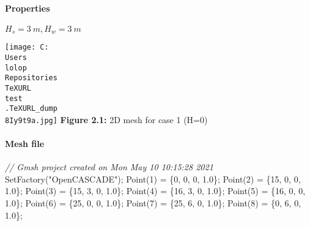 \documentclass[11pt]{article}
\newenvironment{Shaded}{}{}
\newcommand{\DecValTok}[1]{\textcolor[rgb]{0.25,0.63,0.44}{{#1}}}
\newcommand{\FloatTok}[1]{\textcolor[rgb]{0.25,0.63,0.44}{{#1}}}
\newcommand{\StringTok}[1]{\textcolor[rgb]{0.25,0.44,0.63}{{#1}}}
\newcommand{\CommentTok}[1]{\textcolor[rgb]{0.38,0.63,0.69}{\textit{{#1}}}}
\newcommand{\NormalTok}[1]{{#1}}
\newcommand{\OperatorTok}[1]{\textcolor[rgb]{0.40,0.40,0.40}{{#1}}}
\begin{document}
\hypertarget{properties-1}{%
\paragraph{Properties}\label{properties-1}}

\(H_s = 3\ m, H_w = 3\ m\)

\texttt{[image: C:\\Users\\lolop\\Repositories\\TeXURL\\test\\.TeXURL\_dump\\8Iy9t9a.jpg]} \textbf{Figure 2.1:}
2D mesh for case 1 (H=0)

\hypertarget{mesh-file}{%
\paragraph{Mesh file}\label{mesh-file}}

\begin{Shaded}
\begin{Highlighting}[]
\CommentTok{// Gmsh project created on Mon May 10 10:15:28 2021}
\NormalTok{SetFactory}\OperatorTok{(}\StringTok{"OpenCASCADE"}\OperatorTok{);}
\NormalTok{Point}\OperatorTok{(}\DecValTok{1}\OperatorTok{)} \OperatorTok{=} \OperatorTok{\{}\DecValTok{0}\OperatorTok{,} \DecValTok{0}\OperatorTok{,} \DecValTok{0}\OperatorTok{,} \FloatTok{1.0}\OperatorTok{\};}
\NormalTok{Point}\OperatorTok{(}\DecValTok{2}\OperatorTok{)} \OperatorTok{=} \OperatorTok{\{}\DecValTok{15}\OperatorTok{,} \DecValTok{0}\OperatorTok{,} \DecValTok{0}\OperatorTok{,} \FloatTok{1.0}\OperatorTok{\};}
\NormalTok{Point}\OperatorTok{(}\DecValTok{3}\OperatorTok{)} \OperatorTok{=} \OperatorTok{\{}\DecValTok{15}\OperatorTok{,} \DecValTok{3}\OperatorTok{,} \DecValTok{0}\OperatorTok{,} \FloatTok{1.0}\OperatorTok{\};}
\NormalTok{Point}\OperatorTok{(}\DecValTok{4}\OperatorTok{)} \OperatorTok{=} \OperatorTok{\{}\DecValTok{16}\OperatorTok{,} \DecValTok{3}\OperatorTok{,} \DecValTok{0}\OperatorTok{,} \FloatTok{1.0}\OperatorTok{\};}
\NormalTok{Point}\OperatorTok{(}\DecValTok{5}\OperatorTok{)} \OperatorTok{=} \OperatorTok{\{}\DecValTok{16}\OperatorTok{,} \DecValTok{0}\OperatorTok{,} \DecValTok{0}\OperatorTok{,} \FloatTok{1.0}\OperatorTok{\};}
\NormalTok{Point}\OperatorTok{(}\DecValTok{6}\OperatorTok{)} \OperatorTok{=} \OperatorTok{\{}\DecValTok{25}\OperatorTok{,} \DecValTok{0}\OperatorTok{,} \DecValTok{0}\OperatorTok{,} \FloatTok{1.0}\OperatorTok{\};}
\NormalTok{Point}\OperatorTok{(}\DecValTok{7}\OperatorTok{)} \OperatorTok{=} \OperatorTok{\{}\DecValTok{25}\OperatorTok{,} \DecValTok{6}\OperatorTok{,} \DecValTok{0}\OperatorTok{,} \FloatTok{1.0}\OperatorTok{\};}
\NormalTok{Point}\OperatorTok{(}\DecValTok{8}\OperatorTok{)} \OperatorTok{=} \OperatorTok{\{}\DecValTok{0}\OperatorTok{,} \DecValTok{6}\OperatorTok{,} \DecValTok{0}\OperatorTok{,} \FloatTok{1.0}\OperatorTok{\};}

\end{Highlighting}
\end{Shaded}
\end{document}
